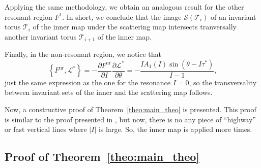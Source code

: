 \documentclass[a4paper,10pt]{article}
\theoremstyle{definition}
\begin{document}
Applying the same methodology, we obtain an analogous result for the other resonant region $F^1$.
In short, we conclude that the image $\mathcal{S}(\mathcal{T}_i)$ of an invariant torus $\mathcal{T}_i$ of
the inner map under the scattering map intersects tranversally another invariant torus $\mathcal{T}_{i+1}$
of the inner map.

Finally, in the non-resonant region, we notice that
$$\left\{F^{\text{nr}} , \mathcal{L}^*\right\} = -\frac{\partial F^{\text{nr}}}{\partial I}\frac{\partial \mathcal{L}^*}{\partial \theta} = -\frac{IA_{1}(I)\sin(\theta - I\tau^*)}{I-1},$$
just the same expression as the one for the resonance $I = 0$, so the transversality between invariant sets of the inner and the scattering map follows.

Now, a constructive proof of Theorem~\ref{theo:main_theo} is presented.
This proof is similar to the proof presented in \cite{Delshams2017}, but now, there is no any piece of ``highway'' or fast vertical lines where $\left|I\right|$ is large.
So, the inner map is applied more times.

\subsection{Proof of Theorem~\ref{theo:main_theo}}
\end{document}
